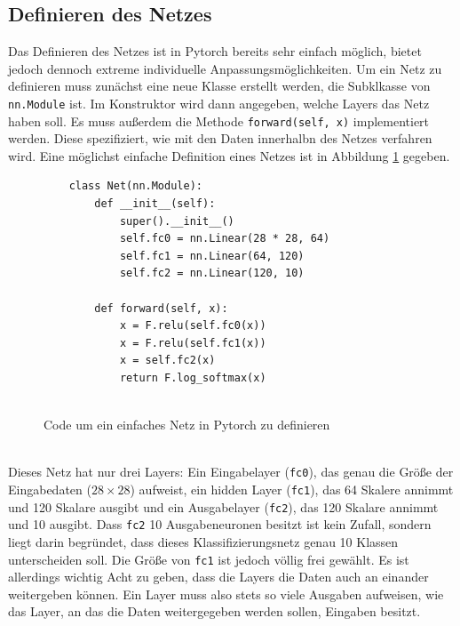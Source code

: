 \documentclass{article}
\begin{document}
\subsection{Definieren des Netzes}
Das Definieren des Netzes ist in Pytorch bereits sehr einfach möglich, bietet jedoch dennoch extreme individuelle Anpassungsmöglichkeiten. Um ein Netz zu definieren muss zunächst eine neue Klasse erstellt werden, die Subklkasse von \texttt{nn.Module} ist. Im Konstruktor wird dann angegeben, welche Layers das Netz haben soll. Es muss außerdem die Methode \texttt{forward(self, x)} implementiert werden. Diese spezifiziert, wie mit den Daten innerhalbn des Netzes verfahren wird. Eine möglichst einfache Definition  eines Netzes ist in Abbildung \ref{Net_simple_definition} gegeben.
\begin{figure}[h]
	\begin{verbatim}
	class Net(nn.Module):
		def __init__(self):
			super().__init__()
			self.fc0 = nn.Linear(28 * 28, 64)
			self.fc1 = nn.Linear(64, 120)
			self.fc2 = nn.Linear(120, 10)
	
		def forward(self, x):
			x = F.relu(self.fc0(x))
			x = F.relu(self.fc1(x))
			x = self.fc2(x)
			return F.log_softmax(x)
	
	\end{verbatim}
	\caption{Code um ein einfaches Netz in Pytorch zu definieren}
	\label{Net_simple_definition}
\end{figure}\\
Dieses Netz hat nur drei Layers: Ein Eingabelayer (\texttt{fc0}), das genau die Größe der Eingabedaten ($28\times28$) aufweist, ein hidden Layer (\texttt{fc1}), das 64 Skalere annimmt und 120 Skalare ausgibt und ein Ausgabelayer (\texttt{fc2}), das 120 Skalare annimmt und 10 ausgibt. Dass \texttt{fc2} 10 Ausgabeneuronen besitzt ist kein Zufall, sondern liegt darin begründet, dass dieses Klassifizierungsnetz genau 10 Klassen unterscheiden soll. Die Größe von \texttt{fc1} ist jedoch völlig frei gewählt. Es ist allerdings wichtig Acht zu geben, dass die Layers die Daten auch an einander weitergeben können. Ein Layer muss also stets so viele Ausgaben aufweisen, wie das Layer, an das die Daten weitergegeben werden sollen, Eingaben besitzt.\\
\end{document}

